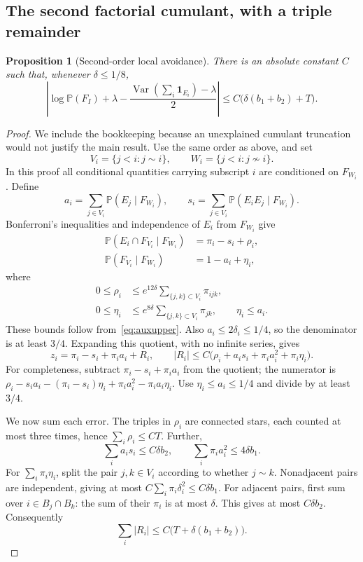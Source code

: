 \documentclass[11pt]{article}
\newtheorem{proposition}[theorem]{Proposition}
\theoremstyle{definition}\newtheorem{definition}[theorem]{Definition}
\theoremstyle{remark}\newtheorem{remark}[theorem]{Remark}
\newcommand{\PP}{\mathbb P}
\newcommand{\Var}{\operatorname{Var}}
\newcommand{\ind}{\mathbf 1}
\newcommand{\la}{\lambda}
\begin{document}
\subsection{The second factorial cumulant, with a triple remainder}
\begin{proposition}[Second-order local avoidance]\label{prop:local}
There is an absolute constant $C$ such that, whenever $\delta\le1/8$,
\begin{equation}
 \left|\log\PP(F_I)+\la-
       \frac{\Var(\sum_i\ind_{E_i})-\la}{2}\right|
 \le C\bigl(\delta(b_1+b_2)+T\bigr).
 \label{eq:localsecond}
\end{equation}
\end{proposition}
\begin{proof}
We include the bookkeeping because an unexplained cumulant truncation
would not justify the main result. Use the same order as above, and set
\[
 V_i=\{j<i:j\sim i\},\qquad W_i=\{j<i:j\not\sim i\}.
\]
In this proof all conditional quantities carrying subscript $i$ are
conditioned on $F_{W_i}$. Define
\[
 a_i=\sum_{j\in V_i}\PP(E_j\mid F_{W_i}),\qquad
 s_i=\sum_{j\in V_i}\PP(E_iE_j\mid F_{W_i}).
\]
Bonferroni's inequalities and independence of $E_i$ from $F_{W_i}$ give
\begin{align*}
 \PP(E_i\cap F_{V_i}\mid F_{W_i})&=\pi_i-s_i+\rho_i,\\
 \PP(F_{V_i}\mid F_{W_i})&=1-a_i+\eta_i,
\end{align*}
where
\begin{align*}
 0\le\rho_i&\le e^{12\delta}
       \sum_{\{j,k\}\subset V_i}\pi_{ijk},\\
 0\le\eta_i&\le e^{8\delta}
       \sum_{\{j,k\}\subset V_i}\pi_{jk},\qquad \eta_i\le a_i.
\end{align*}
These bounds follow from~\eqref{eq:auxupper}. Also
$a_i\le2\delta_i\le1/4$, so the denominator is at least $3/4$.
Expanding this quotient, with no infinite series, gives
\begin{equation}
 z_i=\pi_i-s_i+\pi_i a_i+R_i,\qquad
 |R_i|\le C\bigl(\rho_i+a_i s_i+\pi_i a_i^2+\pi_i\eta_i\bigr).
 \label{eq:quotient}
\end{equation}
For completeness, subtract $\pi_i-s_i+\pi_i a_i$ from the quotient;
the numerator is
$\rho_i-s_i a_i-(\pi_i-s_i)\eta_i+\pi_i a_i^2-\pi_i a_i\eta_i$.
Use $\eta_i\le a_i\le1/4$ and divide by at least $3/4$.

We now sum each error. The triples in $\rho_i$ are connected stars, each
counted at most three times, hence $\sum_i\rho_i\le C T$.
Further,
\[
 \sum_i a_i s_i\le C\delta b_2,\qquad
 \sum_i\pi_i a_i^2\le4\delta b_1.
\]
For $\sum_i\pi_i\eta_i$, split the pair $j,k\in V_i$ according to
whether $j\sim k$. Nonadjacent pairs are independent, giving at most
$C\sum_i\pi_i\delta_i^2\le C\delta b_1$. For adjacent pairs, first
sum over $i\in B_j\cap B_k$: the sum of their $\pi_i$ is at most
$\delta$. This gives at most $C\delta b_2$. Consequently
\begin{equation}
 \sum_i|R_i|\le C\bigl(T+\delta(b_1+b_2)\bigr).
 \label{eq:sumR}
\end{equation}


\end{proof}
\end{document}
